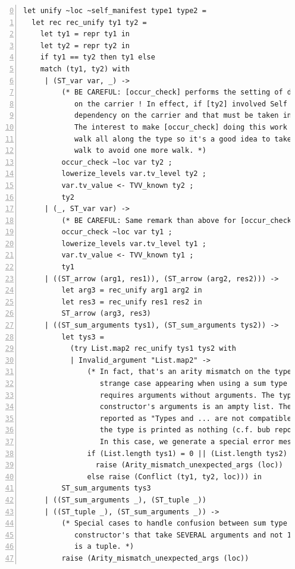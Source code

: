 \label{unify-source-code}
{\footnotesize
\begin{lstlisting}[language=MyOCaml,numbers=left, firstnumber=0,
                   title=The unification algorithm]
let unify ~loc ~self_manifest type1 type2 =
  let rec rec_unify ty1 ty2 =
    let ty1 = repr ty1 in
    let ty2 = repr ty2 in
    if ty1 == ty2 then ty1 else
    match (ty1, ty2) with
     | (ST_var var, _) ->
         (* BE CAREFUL: [occur_check] performs the setting of decl-dependencies
            on the carrier ! In effect, if [ty2] involved Self then we have a
            dependency on the carrier and that must be taken into account !
            The interest to make [occur_check] doing this work is that it
            walk all along the type so it's a good idea to take benefit of this
            walk to avoid one more walk. *)
         occur_check ~loc var ty2 ;
         lowerize_levels var.tv_level ty2 ;
         var.tv_value <- TVV_known ty2 ;
         ty2
     | (_, ST_var var) ->
         (* BE CAREFUL: Same remark than above for [occur_check]. *)
         occur_check ~loc var ty1 ;
         lowerize_levels var.tv_level ty1 ;
         var.tv_value <- TVV_known ty1 ;
         ty1
     | ((ST_arrow (arg1, res1)), (ST_arrow (arg2, res2))) ->
         let arg3 = rec_unify arg1 arg2 in
         let res3 = rec_unify res1 res2 in
         ST_arrow (arg3, res3)
     | ((ST_sum_arguments tys1), (ST_sum_arguments tys2)) ->
         let tys3 =
           (try List.map2 rec_unify tys1 tys2 with
           | Invalid_argument "List.map2" ->
               (* In fact, that's an arity mismatch on the types. There is a
                  strange case appearing when using a sum type constructor that
                  requires arguments without arguments. The type of the
                  constructor's arguments is an ampty list. Then the conflict is
                  reported as "Types and ... are not compatible". Hence one of
                  the type is printed as nothing (c.f. bub report #180).
                  In this case, we generate a special error message. *)
               if (List.length tys1) = 0 || (List.length tys2) = 0 then
                 raise (Arity_mismatch_unexpected_args (loc))
               else raise (Conflict (ty1, ty2, loc))) in
         ST_sum_arguments tys3
     | ((ST_sum_arguments _), (ST_tuple _))
     | ((ST_tuple _), (ST_sum_arguments _)) ->
         (* Special cases to handle confusion between sum type value
            constructor's that take SEVERAL arguments and not 1 argument that
            is a tuple. *)
         raise (Arity_mismatch_unexpected_args (loc))

\end{lstlisting}}
